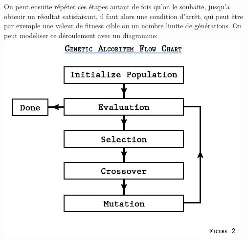\documentclass[11pt]{article}
\begin{document}
On peut ensuite répéter ces étapes autant de fois qu'on le souhaite, jusqu'a obtenir un résultat satisfaisant,
il faut alors une condition d'arrêt, qui peut être par exemple une valeur de fitness cible ou un nombre limite de générations.
On peut modéliser ce déroulement avec un diagramme:
\includegraphics[width=.5\linewidth]{./GA.png}
\end{document}

